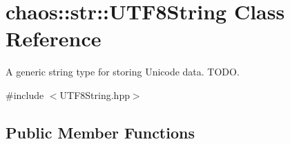 \hypertarget{classchaos_1_1str_1_1_u_t_f8_string}{\section{chaos\-:\-:str\-:\-:U\-T\-F8\-String Class Reference}
\label{classchaos_1_1str_1_1_u_t_f8_string}
}


A generic string type for storing Unicode data. T\-O\-D\-O.  




{\ttfamily \#include $<$U\-T\-F8\-String.\-hpp$>$}

\subsection*{Public Member Functions}
